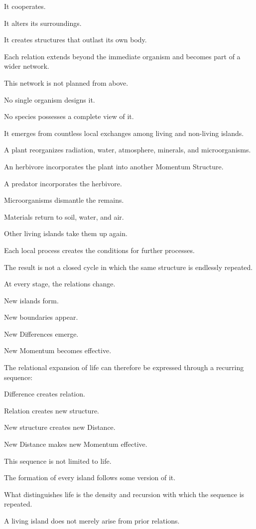 It cooperates.

It alters its surroundings.

It creates structures that outlast its own body.

Each relation extends beyond the immediate organism and becomes part of a wider network.

This network is not planned from above.

No single organism designs it.

No species possesses a complete view of it.

It emerges from countless local exchanges among living and non-living islands.

A plant reorganizes radiation, water, atmosphere, minerals, and microorganisms.

An herbivore incorporates the plant into another Momentum Structure.

A predator incorporates the herbivore.

Microorganisms dismantle the remains.

Materials return to soil, water, and air.

Other living islands take them up again.

Each local process creates the conditions for further processes.

The result is not a closed cycle in which the same structure is endlessly repeated.

At every stage, the relations change.

New islands form.

New boundaries appear.

New Differences emerge.

New Momentum becomes effective.

The relational expansion of life can therefore be expressed through a recurring sequence:

Difference creates relation.

Relation creates new structure.

New structure creates new Distance.

New Distance makes new Momentum effective.

This sequence is not limited to life.

The formation of every island follows some version of it.

What distinguishes life is the density and recursion with which the sequence is repeated.

A living island does not merely arise from prior relations.

